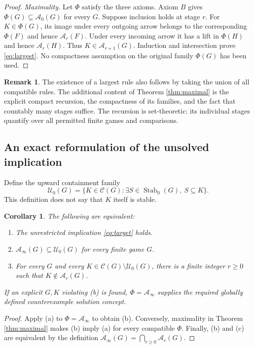 \documentclass[11pt]{article}
\newtheorem{corollary}[theorem]{Corollary}
\theoremstyle{definition}
\newtheorem{remark}[theorem]{Remark}
\newcommand{\Stab}{\operatorname{Stab}_0}
\newcommand{\CC}{\mathscr C}
\newcommand{\A}{\mathcal A}
\newcommand{\Up}{\mathcal U_0}
\begin{document}
\begin{proof}
\emph{Maximality.} Let $\Phi$ satisfy the three axioms. Axiom $B$ gives
$\Phi(G)\subseteq\A_0(G)$ for every $G$. Suppose inclusion holds at stage $r$.
For $K\in\Phi(G)$, its image under every outgoing arrow belongs to the
corresponding $\Phi(F)$ and hence $\A_r(F)$. Under every incoming arrow it has
a lift in $\Phi(H)$ and hence $\A_r(H)$. Thus $K\in\A_{r+1}(G)$.
Induction and intersection prove \eqref{eq:largest}. No compactness assumption
on the original family $\Phi(G)$ has been used.
\end{proof}

\begin{remark}
The existence of a largest rule also follows by taking the union of all
compatible rules. The additional content of Theorem \ref{thm:maximal} is the
explicit compact recursion, the compactness of its families, and the fact that
countably many stages suffice. The recursion is set-theoretic: its individual
stages quantify over all permitted finite games and comparisons.
\end{remark}

\subsection{An exact reformulation of the unsolved implication}\label{sec:equivalence}
Define the upward containment family
\[
 \Up(G)=\{K\in\CC(G):\exists S\in\Stab(G),\ S\subseteq K\}.
\]
This definition does not say that $K$ itself is stable.

\begin{corollary}\label{cor:equivalence}
The following are equivalent:
\begin{enumerate}[label=(\alph*)]
\item The unrestricted implication \eqref{eq:target} holds.
\item $\A_\infty(G)\subseteq\Up(G)$ for every finite game $G$.
\item For every $G$ and every $K\in\CC(G)\setminus\Up(G)$, there is a finite
integer $r\ge0$ such that $K\notin\A_r(G)$.
\end{enumerate}
If an explicit $G,K$ violating (b) is found, $\Phi=\A_\infty$ supplies the
required globally defined counterexample solution concept.
\end{corollary}
\begin{proof}
Apply (a) to $\Phi=\A_\infty$ to obtain (b). Conversely, maximality in
Theorem \ref{thm:maximal} makes (b) imply (a) for every compatible $\Phi$.
Finally, (b) and (c) are equivalent by the definition
$\A_\infty(G)=\bigcap_{r\ge0}\A_r(G)$.
\end{proof}
\end{document}
